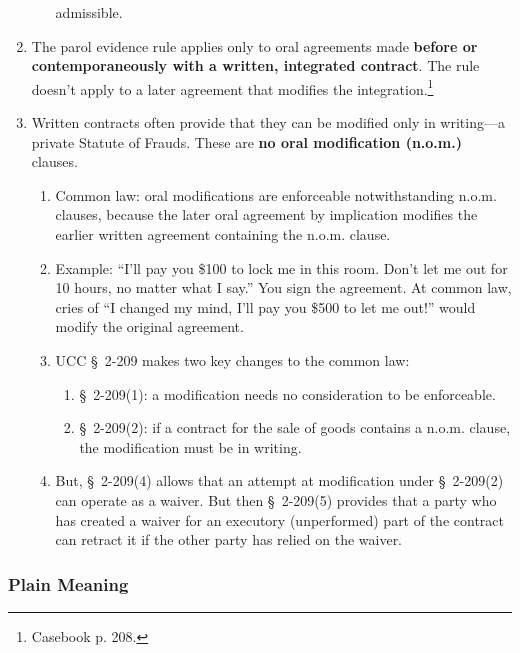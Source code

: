 \begin{enumerate}
\begin{enumerate}
        admissible.
    \end{enumerate}
    \item The parol evidence rule applies only to oral agreements made 
    \textbf{before or contemporaneously with a written, integrated contract}. 
    The rule doesn't apply to a later agreement that modifies the 
    integration.\footnote{Casebook p. 208.}
    \item Written contracts often provide that they can be modified only in 
    writing---a private Statute of Frauds. These are \textbf{no oral 
    modification (n.o.m.)} clauses.
    \begin{enumerate}
        \item Common law: oral modifications are enforceable notwithstanding 
        n.o.m. clauses, because the later oral agreement by implication modifies 
        the earlier written agreement containing the n.o.m. clause.
        \item Example: ``I'll pay you \$100 to lock me in this room. Don't let me 
        out for 10 hours, no matter what I say.'' You sign the agreement. At 
        common law, cries of ``I changed my mind, I'll pay you \$500 to let me 
        out!'' would modify the original agreement.
        \item UCC \S\ 2-209 makes two key changes to the common law:
        \begin{enumerate}
            \item \S\ 2-209(1): a modification needs no consideration to be 
            enforceable.
            \item \S\ 2-209(2): if a contract for the sale of goods contains a 
            n.o.m. clause, the modification must be in writing.
        \end{enumerate}
        \item But, \S\ 2-209(4) allows that an attempt at modification under \S\ 
        2-209(2) can operate as a waiver. But then \S\ 2-209(5) provides that a 
        party who has created a waiver for an executory (unperformed) part of the 
        contract can retract it if the other party has relied on the waiver.
    \end{enumerate}
\end{enumerate}

\subsubsection{Plain Meaning}

